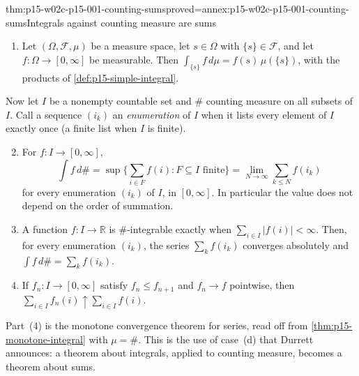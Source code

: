 \begin{hblemma}{thm:p15-w02c-p15-001-counting-sums}{proved=annex:p15-w02c-p15-001-counting-sums}{Integrals against counting measure are sums}
\par\nobreak
\begin{enumerate}
\item Let \((\Omega,\mathcal F,\mu)\) be a measure space, let
      \(s\in\Omega\) with \(\{s\}\in\mathcal F\), and let
      \(f:\Omega\to[0,\infty]\) be measurable. Then
      \(\int_{\{s\}}f\,d\mu=f(s)\,\mu(\{s\})\), with the products of
      \cref{def:p15-simple-integral}.
\end{enumerate}
Now let \(I\) be a nonempty countable set and \(\#\) counting measure on
all subsets of \(I\). Call a sequence \((i_k)\) an \emph{enumeration} of
\(I\) when it lists every element of \(I\) exactly once (a finite list
when \(I\) is finite).
\begin{enumerate}\setcounter{enumi}{1}
\item For \(f:I\to[0,\infty]\),
      \[
       \int f\,d\#=\sup\Big\{\sum_{i\in F}f(i):F\subseteq I\text{ finite}\Big\}
       =\lim_{N\to\infty}\sum_{k\leq N}f(i_k)
      \]
      for every enumeration \((i_k)\) of \(I\), in \([0,\infty]\). In
      particular the value does not depend on the order of summation.
\item A function \(f:I\to\mathbb R\) is \(\#\)-integrable exactly when
      \(\sum_{i\in I}|f(i)|<\infty\). Then, for every enumeration
      \((i_k)\), the series \(\sum_kf(i_k)\) converges absolutely and
      \(\int f\,d\#=\sum_kf(i_k)\).
\item If \(f_n:I\to[0,\infty]\) satisfy \(f_n\leq f_{n+1}\) and
      \(f_n\to f\) pointwise, then
      \(\sum_{i\in I}f_n(i)\uparrow\sum_{i\in I}f(i)\).
\end{enumerate}
\end{hblemma}

Part~(4) is the monotone convergence theorem for series, read off from
\cref{thm:p15-monotone-integral} with \(\mu=\#\). This is the use of
case~(d) that Durrett announces: a theorem about integrals, applied to
counting measure, becomes a theorem about sums.

